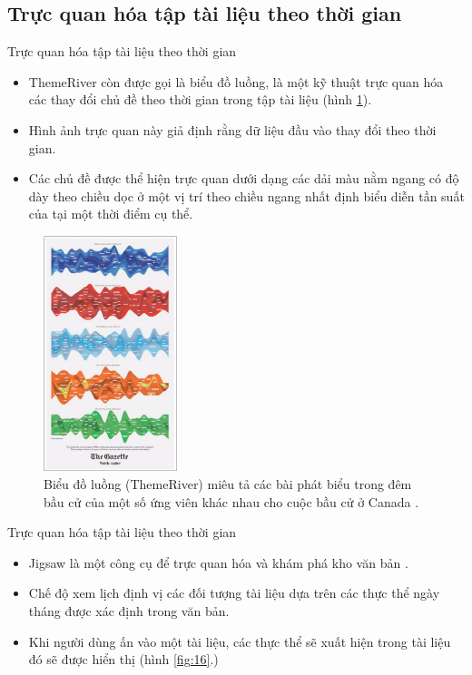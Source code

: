 \documentclass[10pt]{beamer}
\theoremstyle{remark}
\theoremstyle{definition}
\begin{document}
\subsection{Trực quan hóa tập tài liệu theo thời gian}

\begin{frame}{Trực quan hóa tập tài liệu theo thời gian}
	\begin{itemize}
		\item ThemeRiver \cite{173} còn được gọi là biểu đồ luồng, là một kỹ thuật trực quan hóa các thay đổi chủ đề theo thời gian trong tập tài liệu (hình \ref{fig:15}).
		\item Hình ảnh trực quan này giả định rằng dữ liệu đầu vào thay đổi theo thời gian.
		\item Các chủ đề được thể hiện trực quan dưới dạng các dải màu nằm ngang có độ dày theo chiều dọc ở một vị trí theo chiều ngang nhất định biểu diễn tần suất của tại một thời điểm cụ thể.
	\end{itemize}
\end{frame}

\begin{figure}[h!]
	\centering
	\includegraphics[width=0.35\textwidth]{15.png}
	\caption{Biểu đồ luồng (ThemeRiver) miêu tả các bài phát biểu trong đêm bầu cử của một số ứng viên khác nhau cho cuộc bầu cử ở Canada \cite{173}.}
	\label{fig:15}
\end{figure}

\begin{frame}{Trực quan hóa tập tài liệu theo thời gian}
	\begin{itemize}
		\item Jigsaw là một công cụ để trực quan hóa và khám phá kho văn bản \cite{155}.
		\item Chế độ xem lịch định vị các đối tượng tài liệu dựa trên các thực thể ngày tháng được xác định trong văn bản.
		\item Khi người dùng ấn vào một tài liệu, các thực thể sẽ xuất hiện trong tài liệu đó sẽ được hiển thị (hình \ref{fig:16}.)
	\end{itemize}
\end{frame}
\end{document}
